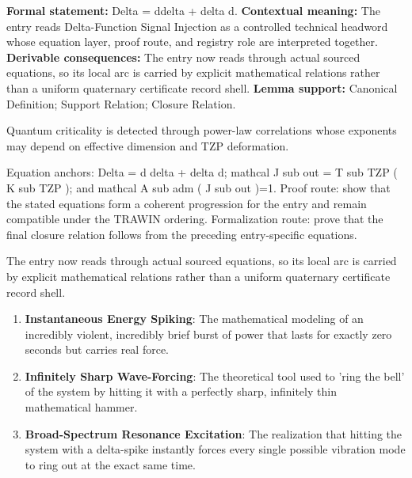 \begingroup\footnotesize\setlength{\emergencystretch}{3em}\sloppy
\textbf{Formal statement:} Delta = ddelta + delta d. \textbf{Contextual meaning:} The entry reads Delta-Function Signal Injection as a controlled technical headword whose equation layer, proof route, and registry role are interpreted together. \textbf{Derivable consequences:} The entry now reads through actual sourced equations, so its local arc is carried by explicit mathematical relations rather than a uniform quaternary certificate record shell. \textbf{Lemma support:} Canonical Definition; Support Relation; Closure Relation.\par
\endgroup

Quantum criticality is detected through power-law correlations whose exponents may depend on effective dimension and TZP deformation.

Equation anchors: Delta = d delta + delta d; mathcal J sub out = T sub TZP ( K sub TZP ); and mathcal A sub adm ( J sub out )=1. Proof route: show that the stated equations form a coherent progression for the entry and remain compatible under the TRAWIN ordering. Formalization route: prove that the final closure relation follows from the preceding entry-specific equations.

The entry now reads through actual sourced equations, so its local arc is carried by explicit mathematical relations rather than a uniform quaternary certificate record shell.
\endgroup

\begin{enumerate}[leftmargin=1.6em,itemsep=6pt,topsep=4pt]
\item \textbf{Instantaneous Energy Spiking}: The mathematical modeling of an incredibly violent, incredibly brief burst of power that lasts for exactly zero seconds but carries real force.
\item \textbf{Infinitely Sharp Wave-Forcing}: The theoretical tool used to 'ring the bell' of the system by hitting it with a perfectly sharp, infinitely thin mathematical hammer.
\item \textbf{Broad-Spectrum Resonance Excitation}: The realization that hitting the system with a delta-spike instantly forces every single possible vibration mode to ring out at the exact same time.
\end{enumerate}

